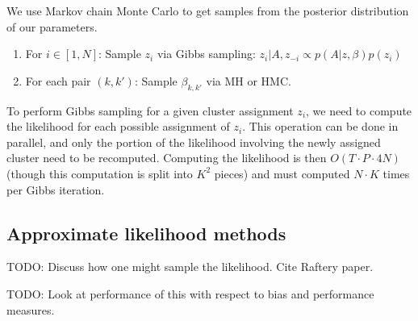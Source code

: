 \documentclass[11pt]{article}
\begin{document}
We use Markov chain Monte Carlo to get samples from the posterior distribution of our parameters.  

\begin{enumerate}
\item For $i \in [1,N]$: Sample $z_i$ via Gibbs sampling: 
$z_i | A, z_{-i} \propto p(A|z,\beta) p(z_i)$
\item For each pair $(k,k')$: Sample $\beta_{k,k'}$ via MH or HMC.
\end{enumerate}

To perform Gibbs sampling for a given cluster assignment $z_i$, we need to compute the likelihood for each possible assignment of $z_i$. 
This operation can be done in parallel, and only the portion of the likelihood involving the newly assigned cluster  need to be recomputed.  Computing the likelihood is then $O(T \cdot P \cdot 4N)$ (though this computation is split into $K^2$ pieces) and must computed $N \cdot K$ times per Gibbs iteration.

\subsection{Approximate likelihood methods}

TODO: Discuss how one might sample the likelihood.  Cite Raftery paper.

TODO: Look at performance of this with respect to bias and performance measures.




\end{document}

